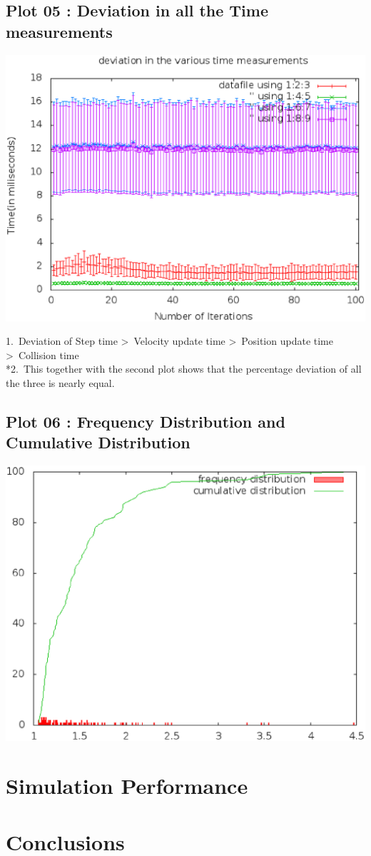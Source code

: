 \documentclass[11pt]{article}
\begin{document}
\subsection{Plot 05 : Deviation in all the Time measurements}
\begin{center}
\includegraphics[scale=0.5]{plot05}
\end{center}
1.\ Deviation of Step time \textgreater \ Velocity update time \textgreater \ Position update time \textgreater \ Collision time
\\*2.\ This together with the second plot shows that the percentage deviation of all the three is nearly equal.
\subsection{Plot 06 : Frequency Distribution and Cumulative Distribution}
\begin{center}
\includegraphics[scale=0.5]{plot06}
\end{center}
\section{Simulation Performance}

\section{Conclusions}



\end{document}
